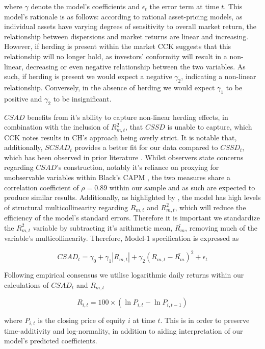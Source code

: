 \documentclass[12pt]{article}
\numberwithin{table}{section}   %
\begin{document}
where $\gamma$ denote the model’s coefficients and $\epsilon_t$ the error term at time $t$. This model’s rationale is as follows: according to rational asset-pricing models, as individual assets have varying degrees of sensitivity to overall market return, the relationship between dispersions and market returns are linear and increasing. However, if herding is present within the market CCK suggests that this relationship will no longer hold, as investors’ conformity will result in a non-linear, decreasing or even negative relationship between the two variables. As such, if herding is present we would expect a negative $\gamma_2$, indicating a non-linear relationship. Conversely, in the absence of herding we would expect $\gamma_1$ to be positive and $\gamma_2$ to be insignificant.

$CSAD$ benefits from it’s ability to capture non-linear herding effects, in combination with the inclusion of $R_{m,t}^2$, that $CSSD$ is unable to capture, which CCK notes results in CH’s approach being overly strict. It is notable that, additionally, $SCSAD_t$ provides a better fit for our data compared to $CSSD_t$, which has been observed in prior literature \citep{gleason}. Whilst observers state concerns regarding $CSAD$’s construction, notably it’s reliance on proxying for unobservable variables within Black’s CAPM \citep{yao, tan}, the two measures share a correlation coefficient of $\rho=0.89$ within our sample and as such are expected to produce similar results. Additionally, as highlighted by \citet{yao}, the model has high levels of structural multicollinearity regarding $R_{m,t}$ and $R_{m,t}^2$, which will reduce the efficiency of the model's standard errors. Therefore it is important we standardize the $R_{m,t}^2$ variable by subtracting it's arithmetic mean, $\bar{R_m}$, removing much of the variable's multicollinearity. Therefore, Model-1 specification is expressed as

\begin{equation}\label{model-1}
    CSAD_t=\gamma_0+\gamma_1 |R_{m,t}|+\gamma_2 (R_{m,t}-\bar{R_m})^2+\epsilon_t
\end{equation}

Following empirical consensus \citep{yao, tan, chiang} we utilise logarithmic daily returns within our calculations of $CSAD_t$ and $R_{m,t}$

$$
R_{i,t}=100\times(\ln{P_{i,t}}-\ln{P_{i,t-1}})
$$

where $P_{i,t}$ is the closing price of equity $i$ at time $t$. This is in order to preserve time-additivity and log-normality, in addition to aiding interpretation of our model’s predicted coefficients.
\end{document}
